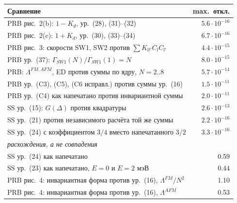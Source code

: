 \begin{tabular}{lr}
\toprule
Сравнение & max.\ откл. \\
\midrule
PRB рис.~2(b): $1-K_d$, ур.~(28), (31)--(32) & $5.6\cdot 10^{-16}$ \\
PRB рис.~2(c): $1+K_d$, ур.~(30), (33)--(34) & $6.7\cdot 10^{-16}$ \\
PRB рис.~3: скорости SW1, SW2 против $\sum K_{ll'}C_lC_{l'}$ & $4.4\cdot 10^{-15}$ \\
PRB ур.~(37): $\Gamma_{SW1}(N)/\Gamma_{SW1}(1)=N$ & $8.0\cdot 10^{-15}$ \\
PRB: $\Lambda^{FM,AFM}$, ED против суммы по ядру, $N=2..8$ & $5.7\cdot 10^{-14}$ \\
PRB ур.~(C3), (C5), (C6 исправл.) против суммы ур.~(16) & $1.5\cdot 10^{-11}$ \\
PRB ур.~(C4) как напечатано против инвариантной суммы & $2.0\cdot 10^{-11}$ \\
SS ур.~(15): $G(\Delta)$ против квадратуры & $2.6\cdot 10^{-13}$ \\
SS ур.~(21) против независимого расчёта той же суммы & $2.2\cdot 10^{-16}$ \\
SS ур.~(24) с коэффициентом $3/4$ вместо напечатанного $3/2$ & $3.3\cdot 10^{-16}$ \\
\midrule
\multicolumn{2}{l}{\emph{расхождения, а не совпадения}} \\
SS ур.~(24) как напечатано & 0.59 \\
SS ур.~(23) как напечатано, $E=0$ и $E=2$ мэВ & 0.44 \\
PRB рис.~4: инвариантная форма против ур.~(16), $\Lambda^{FM}/N^2$ & 1.10 \\
PRB рис.~4: инвариантная форма против ур.~(16), $\Lambda^{AFM}$ & 0.53 \\
\bottomrule
\end{tabular}
